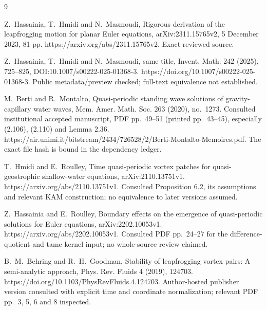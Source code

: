 \documentclass[10pt]{article}
\begin{document}
9\par
Z. Hassainia, T. Hmidi and N. Masmoudi, Rigorous derivation of the leapfrogging motion for planar Euler equations, arXiv:2311.15765v2, 5 December 2023, 81 pp. https://arxiv.org/abs/2311.15765v2. Exact reviewed source.\par
Z. Hassainia, T. Hmidi and N. Masmoudi, same title, Invent. Math. 242 (2025), 725–825, DOI:10.1007/s00222-025-01368-3. https://doi.org/10.1007/s00222-025-01368-3. Public metadata/preview checked; full-text equivalence not established.\par
M. Berti and R. Montalto, Quasi-periodic standing wave solutions of gravity-capillary water waves, Mem. Amer. Math. Soc. 263 (2020), no. 1273. Consulted institutional accepted manuscript, PDF pp. 49–51 (printed pp. 43–45), especially (2.106), (2.110) and Lemma 2.36. https://air.unimi.it/bitstream/2434/726528/2/Berti-Montalto-Memoires.pdf. The exact file hash is bound in the dependency ledger.\par
T. Hmidi and E. Roulley, Time quasi-periodic vortex patches for quasi-geostrophic shallow-water equations, arXiv:2110.13751v1. https://arxiv.org/abs/2110.13751v1. Consulted Proposition 6.2, its assumptions and relevant KAM construction; no equivalence to later versions assumed.\par
Z. Hassainia and E. Roulley, Boundary effects on the emergence of quasi-periodic solutions for Euler equations, arXiv:2202.10053v1. https://arxiv.org/abs/2202.10053v1. Consulted PDF pp. 24–27 for the difference-quotient and tame kernel input; no whole-source review claimed.\par
B. M. Behring and R. H. Goodman, Stability of leapfrogging vortex pairs: A semi-analytic approach, Phys. Rev. Fluids 4 (2019), 124703. https://doi.org/10.1103/PhysRevFluids.4.124703. Author-hosted publisher version consulted with explicit time and coordinate normalization; relevant PDF pp. 3, 5, 6 and 8 inspected.\par
\end{document}
